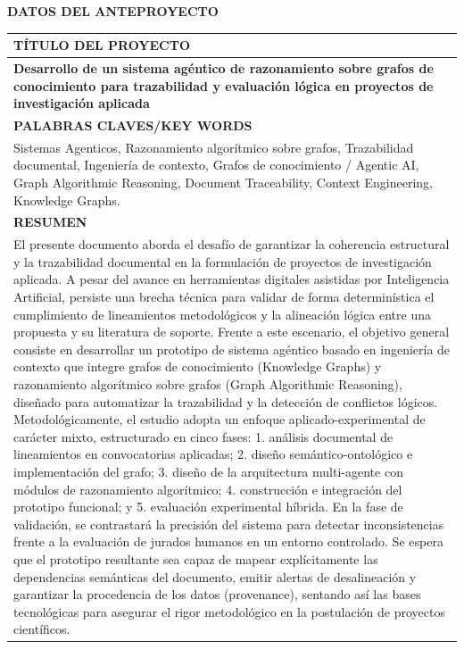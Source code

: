 \documentclass[12pt,letterpaper]{article}
\begin{document}
\textbf{DATOS DEL ANTEPROYECTO}
\begin{longtable}{|p{\dimexpr\textwidth-2\tabcolsep-2\arrayrulewidth}|}
\hline
\rowcolor{lightgray}\centering\arraybackslash\textbf{TÍTULO DEL PROYECTO} \\ \hline
 \textbf{Desarrollo de un sistema agéntico de razonamiento sobre grafos de conocimiento para trazabilidad y evaluación lógica en proyectos de investigación aplicada}\\\hline

\rowcolor{lightgray}\centering\arraybackslash\textbf{PALABRAS CLAVES/KEY WORDS} \\\hline
Sistemas Agenticos, Razonamiento algorítmico sobre grafos, Trazabilidad documental, Ingeniería de contexto, Grafos de conocimiento / Agentic AI, Graph Algorithmic Reasoning, Document Traceability, Context Engineering, Knowledge Graphs.
 \\\hline
\rowcolor{lightgray}\centering\arraybackslash\textbf{RESUMEN} \\\hline
El presente documento aborda el desafío de garantizar la coherencia estructural y la trazabilidad documental en la formulación de proyectos de investigación aplicada. A pesar del avance en herramientas digitales asistidas por Inteligencia Artificial, persiste una brecha técnica para validar de forma determinística el cumplimiento de lineamientos metodológicos y la alineación lógica entre una propuesta y su literatura de soporte. Frente a este escenario, el objetivo general consiste en desarrollar un prototipo de sistema agéntico basado en ingeniería de contexto que integre grafos de conocimiento (Knowledge Graphs) y razonamiento algorítmico sobre grafos (Graph Algorithmic Reasoning), diseñado para automatizar la trazabilidad y la detección de conflictos lógicos. Metodológicamente, el estudio adopta un enfoque aplicado-experimental de carácter mixto, estructurado en cinco fases: 1. análisis documental de lineamientos en convocatorias aplicadas; 2. diseño semántico-ontológico e implementación del grafo; 3. diseño de la arquitectura multi-agente con módulos de razonamiento algorítmico; 4. construcción e integración del prototipo funcional; y 5. evaluación experimental híbrida. En la fase de validación, se contrastará la precisión del sistema para detectar inconsistencias frente a la evaluación de jurados humanos en un entorno controlado. Se espera que el prototipo resultante sea capaz de mapear explícitamente las dependencias semánticas del documento, emitir alertas de desalineación y garantizar la procedencia de los datos (provenance), sentando así las bases tecnológicas para asegurar el rigor metodológico en la postulación de proyectos científicos.
\\\hline
\end{longtable}
\setcounter{table}{0}
\end{document}
